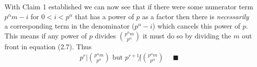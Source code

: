 \noindent With Claim 1 established we can now see that if there were some numerator term
$p^\alpha m - i$ for $0<i<p^\alpha$ that has a power of $p$ as a factor then there is
\textit{necessarily} a corresponding term in the denominator ($p^\alpha -i$) which cancels this
power of $p$. This means if any power of $p$ divides ${p^\alpha m \choose p^\alpha}$ it must do so
by dividing the $m$ out front in equation (2.7). Thus
\begin{align}
    p^r | {p^\alpha m \choose p^\alpha} \text{ but } p^{r+1} \not | {p^\alpha m \choose p^\alpha} \ \ \ \ \ \ \blacksquare \nonumber
\end{align}

